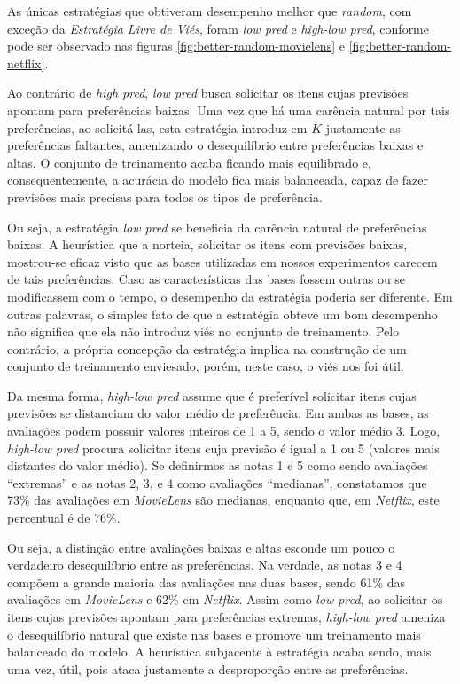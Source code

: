 As únicas estratégias que obtiveram desempenho melhor que \textit{random}, com exceção da \textit{Estratégia Livre de Viés}, foram \textit{low pred} e \textit{high-low pred}, conforme pode ser observado nas figuras \ref{fig:better-random-movielens} e \ref{fig:better-random-netflix}.

Ao contrário de \textit{high pred}, \textit{low pred} busca solicitar os itens cujas previsões apontam para preferências baixas. Uma vez que há uma carência natural por tais preferências, ao solicitá-las, esta estratégia introduz em $K$ justamente as preferências faltantes, amenizando o desequilíbrio entre preferências baixas e altas. O conjunto de treinamento acaba ficando mais equilibrado e, consequentemente, a acurácia do modelo fica mais balanceada, capaz de fazer previsões mais precisas para todos os tipos de preferência. 

Ou seja, a estratégia \textit{low pred} se beneficia da carência natural de preferências baixas. A heurística que a norteia, solicitar os itens com previsões baixas, mostrou-se eficaz visto que as bases utilizadas em nossos experimentos carecem de tais preferências. Caso as características das bases fossem outras ou se modificassem com o tempo, o desempenho da estratégia poderia ser diferente. Em outras palavras, o simples fato de que a estratégia obteve um bom desempenho não significa que ela não introduz viés no conjunto de treinamento. Pelo contrário, a própria concepção da estratégia implica na construção de um conjunto de treinamento enviesado, porém, neste caso, o viés nos foi útil.

Da mesma forma, \textit{high-low pred} assume que é preferível solicitar itens cujas previsões se distanciam do valor médio de preferência. Em ambas as bases, as avaliações podem possuir valores inteiros de 1 a 5, sendo o valor médio 3. Logo, \textit{high-low pred} procura solicitar itens cuja previsão é igual a 1 ou 5 (valores mais distantes do valor médio). Se definirmos as notas 1 e 5 como sendo avaliações ``extremas'' e as notas 2, 3, e 4 como avaliações ``medianas'', constatamos que 73\% das avaliações em \textit{MovieLens} são medianas, enquanto que, em \textit{Netflix}, este percentual é de 76\%.

Ou seja, a distinção entre avaliações baixas e altas esconde um pouco o verdadeiro desequilíbrio entre as preferências. Na verdade, as notas 3 e 4 compõem a grande maioria das avaliações nas duas bases, sendo 61\% das avaliações em \textit{MovieLens} e 62\% em \textit{Netflix}. Assim como \textit{low pred}, ao solicitar os itens cujas previsões apontam para preferências extremas, \textit{high-low pred} ameniza o desequilíbrio natural que existe nas bases e promove um treinamento mais balanceado do modelo. A heurística subjacente à estratégia acaba sendo, mais uma vez, útil, pois ataca justamente a desproporção entre as preferências. 

